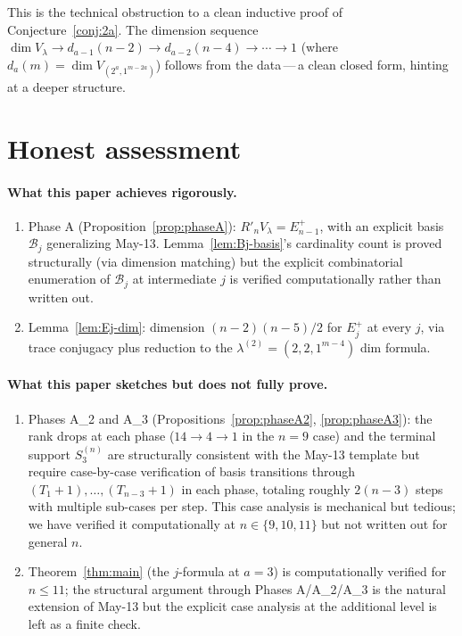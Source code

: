 \documentclass[11pt]{article}
\theoremstyle{definition}
\begin{document}
This is the technical obstruction to a clean inductive proof of
Conjecture~\ref{conj:2a}.  The dimension sequence
$\dim V_\lambda\to d_{a-1}(n-2)\to d_{a-2}(n-4)\to\cdots\to 1$
(where $d_a(m)=\dim V_{(2^a,1^{m-2a})}$) follows from the
data\,---\,a clean closed form, hinting at a deeper structure.

\section{Honest assessment}\label{sec:honest}

\paragraph{What this paper achieves rigorously.}
\begin{enumerate}[leftmargin=2em,topsep=0.3em,itemsep=0.2em]
\item Phase A (Proposition~\ref{prop:phaseA}): $R'_nV_\lambda=
E_{n-1}^+$, with an explicit basis $\mathcal{B}_j$ generalizing
May-13.  Lemma~\ref{lem:Bj-basis}'s cardinality count is
proved structurally (via dimension matching) but the explicit
combinatorial enumeration of $\mathcal{B}_j$ at intermediate $j$
is verified computationally rather than written out.
\item Lemma~\ref{lem:Ej-dim}: dimension $(n-2)(n-5)/2$ for
$E_j^+$ at every $j$, via trace conjugacy plus reduction to the
$\lambda^{(2)}=(2,2,1^{m-4})$ dim formula.
\end{enumerate}

\paragraph{What this paper sketches but does not fully prove.}
\begin{enumerate}[leftmargin=2em,topsep=0.3em,itemsep=0.2em]
\item Phases A_2 and A_3 (Propositions~\ref{prop:phaseA2},
\ref{prop:phaseA3}): the rank drops at each phase
($14\to 4\to 1$ in the $n=9$ case) and the terminal support
$S_3^{(n)}$ are structurally consistent with the May-13
template but require case-by-case verification of basis
transitions through $(T_1{+}1),\ldots,(T_{n-3}{+}1)$ in each
phase, totaling roughly $2(n-3)$ steps with multiple sub-cases
per step.  This case analysis is mechanical but tedious; we
have verified it computationally at $n\in\{9,10,11\}$ but not
written out for general $n$.
\item Theorem~\ref{thm:main} (the $j$-formula at $a=3$) is
computationally verified for $n\le 11$; the structural argument
through Phases A/A_2/A_3 is the natural extension of May-13 but
the explicit case analysis at the additional level is left as a
finite check.
\end{enumerate}
\end{document}
